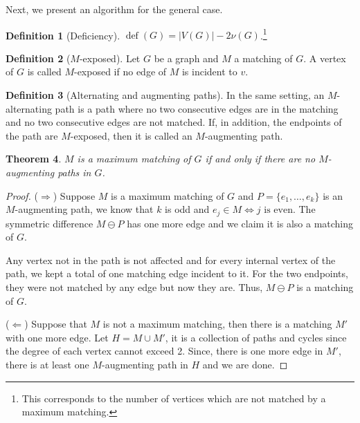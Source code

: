 \documentclass{tufte-handout}
\newtheorem{thm}{Theorem}
\theoremstyle{definition}
\newtheorem{defn}[thm]{Definition}
\theoremstyle{remark}
\DeclareMathOperator{\defic}{def}
\begin{document}
Next, we present an algorithm for the general case.

\begin{defn}[Deficiency]
	$\defic(G) = |V(G)| - 2\nu(G)$.\footnote{This corresponds to the number of vertices which are not matched by a maximum matching.}
\end{defn}
\begin{defn}[$M$-exposed]
	Let $G$ be a graph and $M$ a matching of $G$. A vertex of $G$ is called $M$-exposed if no edge of $M$ is incident to $v$.
\end{defn}
\begin{defn}[Alternating and augmenting paths]
	In the same setting, an $M$-alternating path is a path where no two consecutive edges are in the matching and no two consecutive edges are not matched. If, in addition, the endpoints of the path are $M$-exposed, then it is called an $M$-augmenting path.
\end{defn}
\begin{thm}
	$M$ is a maximum matching of $G$ if and only if there are no $M$-augmenting paths in $G$.
\end{thm}
\begin{proof}
	($\Rightarrow$) Suppose $M$ is a maximum matching of $G$ and $P = \{e_1, \dots, e_k\}$ is an $M$-augmenting path, we know that $k$ is odd and $e_j \in M \Leftrightarrow j \text{ is even}$. The symmetric difference $M \ominus P$ has one more edge and we claim it is also a matching of $G$.
	
	Any vertex not in the path is not affected and for every internal vertex of the path, we kept a total of one matching edge incident to it. For the two endpoints, they were not matched by any edge but now they are. Thus, $M \ominus P$ is a matching of $G$.
	
	($\Leftarrow$) Suppose that $M$ is not a maximum matching, then there is a matching $M'$ with one more edge. Let $H = M \cup M'$, it is a collection of paths and cycles since the degree of each vertex cannot exceed 2. Since, there is one more edge in $M'$, there is at least one $M$-augmenting path in $H$ and we are done.
\end{proof}
\end{document}
